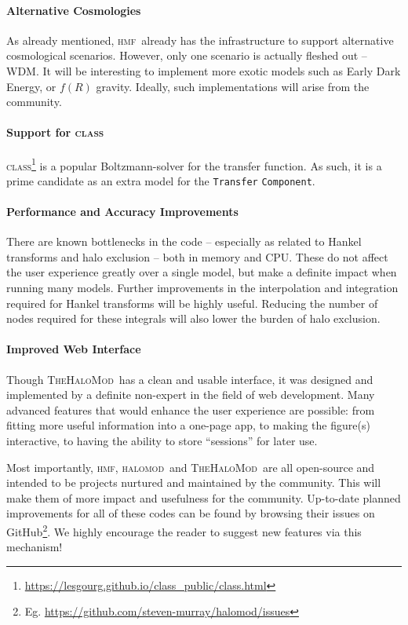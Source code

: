\documentclass[5p,aas_macros]{elsarticle}
\newcommand{\halomod}{\textsc{halomod}}
\newcommand{\thm}{\textsc{TheHaloMod}}
\newcommand{\hmf}{\textsc{hmf}}
\newcommand{\component}{\texttt{Component}}
\begin{document}
\paragraph*{Alternative Cosmologies}
As already mentioned, \hmf\ already has the infrastructure to support alternative cosmological scenarios. However, only one scenario is actually fleshed out -- WDM. It will be interesting to implement more exotic models such as Early Dark Energy, or $f(R)$ gravity. Ideally, such implementations will arise from the community.

\paragraph*{Support for \textsc{class}}
\textsc{class}\footnote{\url{https://lesgourg.github.io/class_public/class.html}} \citep{Lesgourgues2011} is a popular Boltzmann-solver for the transfer function. As such, it is a prime candidate as an extra model for the \verb|Transfer| \component.

\paragraph*{Performance and Accuracy Improvements}
There are known bottlenecks in the code -- especially as related to Hankel transforms and halo exclusion -- both in memory and CPU. 
These do not affect the user experience greatly over a single model, but make a definite impact when running many models. Further improvements in the interpolation and integration required for Hankel transforms will be highly useful. Reducing the number of nodes required for these integrals will also lower the burden of halo exclusion.

\paragraph*{Improved Web Interface}
Though \thm\ has a clean and usable interface, it was designed and implemented by a definite non-expert in the field of web development. 
Many advanced features that would enhance the user experience are possible: from fitting more useful information into a one-page app, to making the figure(s) interactive, to having the ability to store ``sessions'' for later use. 


Most importantly, \hmf, \halomod\ and \thm\ are all open-source and intended to be projects nurtured and maintained by the community. 
This will make them of more impact and usefulness for the community.
Up-to-date planned improvements for all of these codes can be found by browsing their issues on GitHub\footnote{Eg. \url{https://github.com/steven-murray/halomod/issues}}. We highly encourage the reader to suggest new features via this mechanism!
\end{document}
